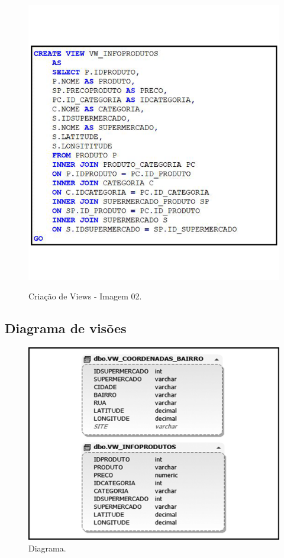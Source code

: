 \begin{figure}[H]
	\centering
   	\caption{Criação de Views - Imagem 02.}
   	\includegraphics[scale=0.8]{Imagens/CriacaoDeViews02.png}
   	\label{fig:modelagemfisica03}
\end{figure}
			
\subsection{Diagrama de visões}
	\begin{figure}[H]
    \centering
    \caption{Diagrama.}
    \includegraphics[scale=0.3]{Imagens/ViewsDiagrama.png}
\end{figure}

